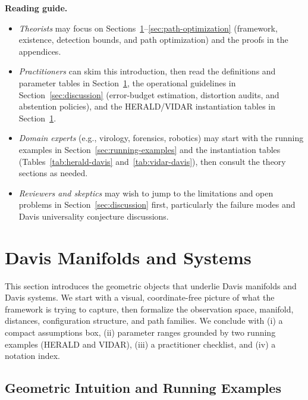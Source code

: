 \documentclass[11pt]{article}
\theoremstyle{remark}
\theoremstyle{plain}
\begin{document}
\begin{mdframed}[linewidth=0.5pt,backgroundcolor=black!1]
\noindent\textbf{Reading guide.}
\begin{itemize}[leftmargin=*]
    \item \emph{Theorists} may focus on Sections~\ref{sec:davis-defs}--\ref{sec:path-optimization} (framework, existence, detection bounds, and path optimization) and the proofs in the appendices.
    
    \item \emph{Practitioners} can skim this introduction, then read the definitions and parameter tables in Section~\ref{sec:davis-defs}, the operational guidelines in Section~\ref{sec:discussion} (error-budget estimation, distortion audits, and abstention policies), and the HERALD/VIDAR instantiation tables in Section~\ref{sec:davis-defs}.
    
    \item \emph{Domain experts} (e.g., virology, forensics, robotics) may start with the running examples in Section~\ref{sec:running-examples} and the instantiation tables (Tables~\ref{tab:herald-davis} and~\ref{tab:vidar-davis}), then consult the theory sections as needed.
    
    \item \emph{Reviewers and skeptics} may wish to jump to the limitations and open problems in Section~\ref{sec:discussion} first, particularly the failure modes and Davis universality conjecture discussions.
\end{itemize}
\end{mdframed}


\section{Davis Manifolds and Systems}
\label{sec:davis-defs}
\label{sec:davis-systems}

This section introduces the geometric objects that underlie Davis manifolds and Davis systems.
We start with a visual, coordinate-free picture of what the framework is trying to capture, then
formalize the observation space, manifold, distances, configuration structure, and path families.
We conclude with (i) a compact assumptions box, (ii) parameter ranges grounded by two running
examples (HERALD and VIDAR), (iii) a practitioner checklist, and (iv) a notation index.

\subsection{Geometric Intuition and Running Examples}
\label{subsec:intuition}
\end{document}
